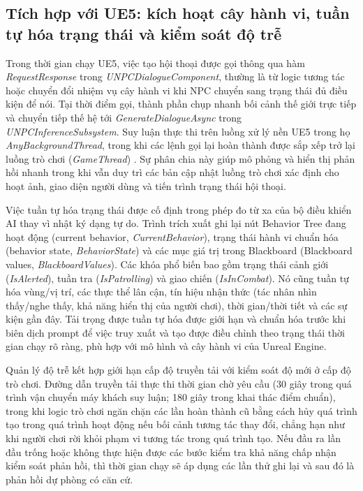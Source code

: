 ﻿\documentclass[a4paper,12pt]{article}
\newcommand{\codeid}[1]{\textit{#1}}
\begin{document}
\subsection{Tích hợp với UE5: kích hoạt cây hành vi, tuần tự hóa trạng thái và kiểm soát độ trễ}
Trong thời gian chạy UE5, việc tạo hội thoại được gọi thông qua hàm \codeid{RequestResponse} trong \codeid{UNPCDialogueComponent}, thường là từ logic tương tác hoặc chuyển đổi nhiệm vụ cây hành vi khi NPC chuyển sang trạng thái đủ điều kiện để nói. Tại thời điểm gọi, thành phần chụp nhanh bối cảnh thế giới trực tiếp và chuyển tiếp thế hệ tới \codeid{GenerateDialogueAsync} trong \codeid{UNPCInferenceSubsystem}. Suy luận thực thi trên luồng xử lý nền UE5 trong họ \codeid{AnyBackgroundThread}, trong khi các lệnh gọi lại hoàn thành được sắp xếp trở lại luồng trò chơi (\codeid{GameThread}) \cite{EpicGames2025TaskGraph,EpicGames2025EAsyncExecution}. Sự phân chia này giúp mô phỏng và hiển thị phản hồi nhanh trong khi vẫn duy trì các bản cập nhật luồng trò chơi xác định cho hoạt ảnh, giao diện người dùng và tiến trình trạng thái hội thoại.

Việc tuần tự hóa trạng thái được cố định trong phép đo từ xa của bộ điều khiển AI thay vì nhật ký dạng tự do. Trình trích xuất ghi lại nút Behavior Tree đang hoạt động (current behavior, \codeid{CurrentBehavior}), trạng thái hành vi chuẩn hóa (behavior state, \codeid{BehaviorState}) và các mục giá trị trong Blackboard (Blackboard values, \codeid{BlackboardValues}). Các khóa phổ biến bao gồm trạng thái cảnh giới (\codeid{IsAlerted}), tuần tra (\codeid{IsPatrolling}) và giao chiến (\codeid{IsInCombat}). Nó cũng tuần tự hóa vùng/vị trí, các thực thể lân cận, tín hiệu nhận thức (tác nhân nhìn thấy/nghe thấy, khả năng hiển thị của người chơi), thời gian/thời tiết và các sự kiện gần đây. Tải trọng được tuần tự hóa được giới hạn và chuẩn hóa trước khi biên dịch prompt để việc truy xuất và tạo được điều chỉnh theo trạng thái thời gian chạy rõ ràng, phù hợp với mô hình \cite{EpicGames2025UEBehaviorTrees} và cây hành vi của Unreal Engine.

Quản lý độ trễ kết hợp giới hạn cấp độ truyền tải với kiểm soát độ mới ở cấp độ trò chơi. Đường dẫn truyền tải thực thi thời gian chờ yêu cầu (30 giây trong quá trình vận chuyển máy khách suy luận; 180 giây trong khai thác điểm chuẩn), trong khi logic trò chơi ngăn chặn các lần hoàn thành cũ bằng cách hủy quá trình tạo trong quá trình hoạt động nếu bối cảnh tương tác thay đổi, chẳng hạn như khi người chơi rời khỏi phạm vi tương tác trong quá trình tạo. Nếu đầu ra lần đầu trống hoặc không thực hiện được các bước kiểm tra khả năng chấp nhận kiểm soát phản hồi, thì thời gian chạy sẽ áp dụng các lần thử ghi lại và sau đó là phản hồi dự phòng có căn cứ.
\end{document}
